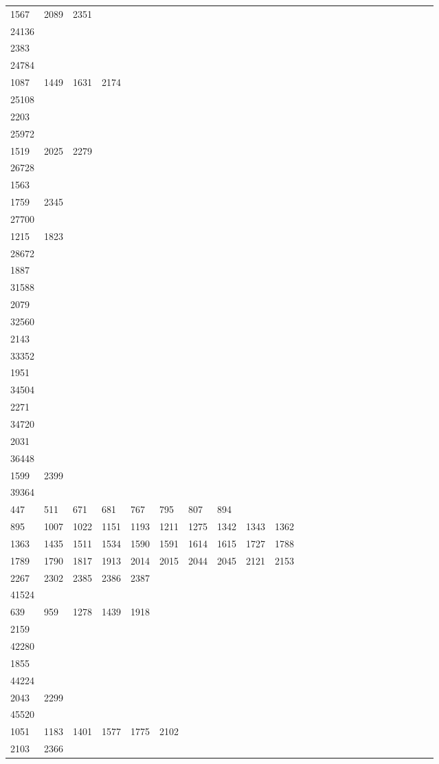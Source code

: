 \begin{longtable}{*{24}{l}}
1567& 2089& 2351\\
24136&&&&&&&&&\\
2383& \\
24784&&&&&&&&&\\
1087& 1449& 1631& 2174& \\
25108&&&&&&&&&\\
2203& \\
25972&&&&&&&&&\\
1519& 2025& 2279& \\
26728&&&&&&&&&\\
1563\\
1759& 2345& \\
27700&&&&&&&&&\\
1215& 1823& \\
28672&&&&&&&&&\\
1887& \\
31588&&&&&&&&&\\
2079& \\
32560&&&&&&&&&\\
2143& \\
33352&&&&&&&&&\\
1951& \\
34504&&&&&&&&&\\
2271& \\
34720&&&&&&&&&\\
2031\\
36448&&&&&&&&&\\
1599& 2399& \\
39364&&&&&&&&&\\
447& 511& 671& 681& 767& 795& 807& 894\\
895& 1007& 1022& 1151& 1193& 1211& 1275& 1342& 1343& 1362\\
1363& 1435& 1511& 1534& 1590& 1591& 1614& 1615& 1727& 1788\\
1789& 1790& 1817& 1913& 2014& 2015& 2044& 2045& 2121& 2153\\
2267& 2302& 2385& 2386& 2387& \\
41524&&&&&&&&&\\
639& 959& 1278& 1439& 1918\\
2159& \\
42280&&&&&&&&&\\
1855& \\
44224&&&&&&&&&\\
2043& 2299& \\
45520&&&&&&&&&\\
1051& 1183& 1401& 1577& 1775& 2102\\
2103& 2366& \\

\end{longtable}
